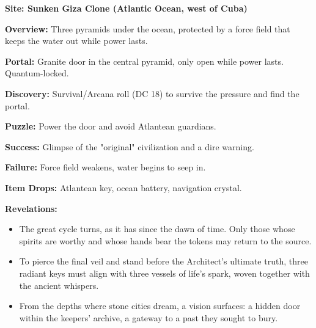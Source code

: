 \documentclass[12pt]{article}
\begin{document}
\textbf{Site: Sunken Giza Clone (Atlantic Ocean, west of Cuba)}

\textbf{Overview:}  
Three pyramids under the ocean, protected by a force field that keeps the water out while power lasts.

\textbf{Portal:}  
Granite door in the central pyramid, only open while power lasts. Quantum-locked.

\textbf{Discovery:}  
Survival/Arcana roll (DC 18) to survive the pressure and find the portal.

\textbf{Puzzle:}  
Power the door and avoid Atlantean guardians.

\textbf{Success:}  
Glimpse of the "original" civilization and a dire warning.

\textbf{Failure:}  
Force field weakens, water begins to seep in.

\textbf{Item Drops:}  
Atlantean key, ocean battery, navigation crystal.

\textbf{Revelations:}
\begin{itemize}
  \item The great cycle turns, as it has since the dawn of time. Only those whose spirits are worthy and whose hands bear the tokens may return to the source.
  \item To pierce the final veil and stand before the Architect's ultimate truth, three radiant keys must align with three vessels of life's spark, woven together with the ancient whispers.
  \item From the depths where stone cities dream, a vision surfaces: a hidden door within the keepers' archive, a gateway to a past they sought to bury.
\end{itemize}
\end{document}

